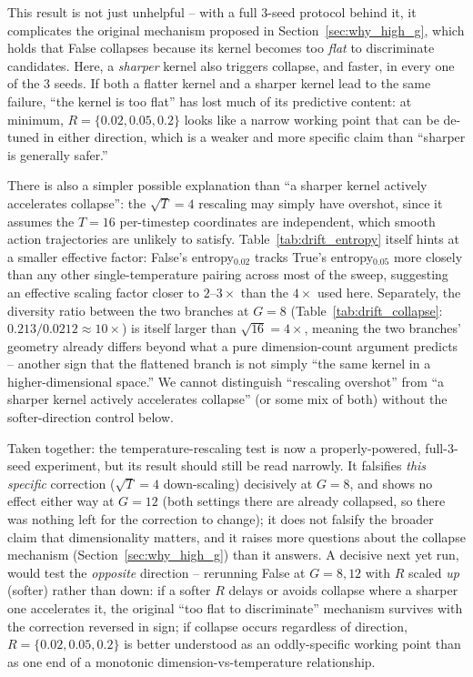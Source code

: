 \documentclass[11pt]{article}
\begin{document}
This result is not just unhelpful -- with a full 3-seed protocol behind
it, it complicates the original mechanism proposed in
Section~\ref{sec:why_high_g}, which holds that False collapses because
its kernel becomes too \emph{flat} to discriminate candidates. Here, a
\emph{sharper} kernel also triggers collapse, and faster, in every one of
the 3 seeds. If both a flatter kernel and a sharper kernel lead to the
same failure, ``the kernel is too flat'' has lost much of its predictive
content: at minimum, $R=\{0.02,0.05,0.2\}$ looks like a narrow working
point that can be de-tuned in either direction, which is a weaker and
more specific claim than ``sharper is generally safer.''

There is also a simpler possible explanation than ``a sharper kernel
actively accelerates collapse'': the $\sqrt{T}=4$ rescaling may simply
have overshot, since it assumes the $T=16$ per-timestep coordinates are
independent, which smooth action trajectories are unlikely to satisfy.
Table~\ref{tab:drift_entropy} itself hints at a smaller effective factor:
False's entropy$_{0.02}$ tracks True's entropy$_{0.05}$ more closely than
any other single-temperature pairing across most of the sweep, suggesting
an effective scaling factor closer to $2$--$3\times$ than the $4\times$
used here. Separately, the diversity ratio between the two branches at
$G=8$ (Table~\ref{tab:drift_collapse}: $0.213/0.0212\approx10\times$) is
itself larger than $\sqrt{16}=4\times$, meaning the two branches' geometry
already differs beyond what a pure dimension-count argument predicts --
another sign that the flattened branch is not simply ``the same kernel in
a higher-dimensional space.'' We cannot distinguish ``rescaling
overshot'' from ``a sharper kernel actively accelerates collapse'' (or
some mix of both) without the softer-direction control below.

Taken together: the temperature-rescaling test is now a properly-powered,
full-3-seed experiment, but its result should still be read narrowly. It
falsifies \emph{this specific} correction ($\sqrt{T}=4$ down-scaling)
decisively at $G=8$, and shows no effect either way at $G=12$ (both
settings there are already collapsed, so there was nothing left for the
correction to change); it does not falsify the broader claim that
dimensionality matters, and it raises more questions about the collapse
mechanism (Section~\ref{sec:why_high_g}) than it answers. A decisive next
yet run, would test the \emph{opposite} direction -- rerunning False at
$G=8,12$ with $R$ scaled \emph{up} (softer) rather than down: if a softer
$R$ delays or avoids collapse where a sharper one accelerates it, the
original ``too flat to discriminate'' mechanism survives with the
correction reversed in sign; if collapse occurs regardless of direction,
$R=\{0.02,0.05,0.2\}$ is better understood as an oddly-specific working
point than as one end of a monotonic dimension-vs-temperature
relationship.
\end{document}
